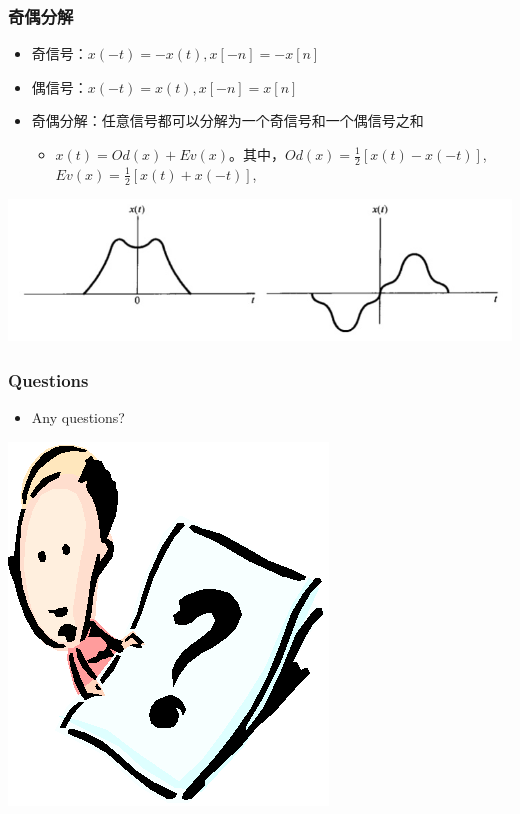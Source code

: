 \documentclass[CJKutf8,xcolor=pdftex,dvipsnames,table]{beamer}
\begin{document}
\begin{CJK*}{UTF8}{song}
  \begin{frame}
    \frametitle{奇偶分解}
    \begin{itemize}
    \item 奇信号：$x(-t)=-x(t), x[-n]=-x[n]$
    \item 偶信号：$x(-t)=x(t), x[-n]=x[n]$
    \item 奇偶分解：任意信号都可以分解为一个奇信号和一个偶信号之和
    \begin{itemize}
    \item $x(t)=Od(x)+Ev(x)$。其中，$Od(x)=\frac{1}{2}[x(t)-x(-t)]$, $Ev(x)=\frac{1}{2}[x(t)+x(-t)]$,
    \end{itemize}
    \end{itemize}
    \begin{center}
      \includegraphics[scale=.4]{odev}
    \end{center}       
  \end{frame}  
  
  \begin{frame}
    \frametitle{Questions}
    \begin{itemize}
    \item Any questions?
    \end{itemize}
    \begin{center}
      \includegraphics[scale=.5]{question}
    \end{center}
  \end{frame}


\end{CJK*}
\end{document}
